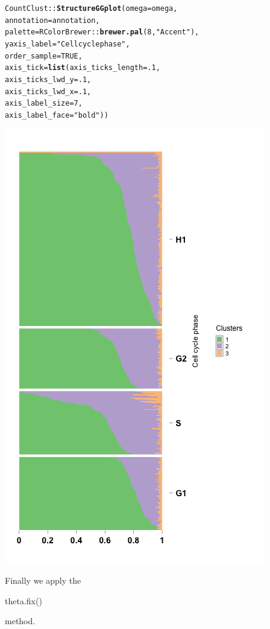 \documentclass[12pt]{article}\usepackage[]{graphicx}\usepackage[usenames,dvipsnames]{color}
\makeatletter
\newcommand{\hlnum}[1]{\textcolor[rgb]{0.686,0.059,0.569}{#1}}%
\newcommand{\hlstr}[1]{\textcolor[rgb]{0.192,0.494,0.8}{#1}}%
\newcommand{\hlopt}[1]{\textcolor[rgb]{0,0,0}{#1}}%
\newcommand{\hlstd}[1]{\textcolor[rgb]{0.345,0.345,0.345}{#1}}%
\newcommand{\hlkwc}[1]{\textcolor[rgb]{0.333,0.667,0.333}{#1}}%
\newcommand{\hlkwd}[1]{\textcolor[rgb]{0.737,0.353,0.396}{\textbf{#1}}}%
\newenvironment{kframe}{%
 \def\at@end@of@kframe{}%
 \ifinner\ifhmode%
  \def\at@end@of@kframe{\end{minipage}}%
  \begin{minipage}{\columnwidth}%
 \fi\fi%
 \def\FrameCommand##1{\hskip\@totalleftmargin \hskip-\fboxsep
 \colorbox{shadecolor}{##1}\hskip-\fboxsep
     \hskip-\linewidth \hskip-\@totalleftmargin \hskip\columnwidth}%
 \MakeFramed {\advance\hsize-\width
   \@totalleftmargin\z@ \linewidth\hsize
   \@setminipage}}%
 {\par\unskip\endMakeFramed%
 \at@end@of@kframe}
\newenvironment{knitrout}{}{} %
\makeatother
\begin{document}
\begin{knitrout}
\begin{kframe}
\begin{alltt}
\hlstd{CountClust}\hlopt{::}\hlkwd{StructureGGplot}\hlstd{(}\hlkwc{omega} \hlstd{= omega,}
                \hlkwc{annotation} \hlstd{= annotation,}
                \hlkwc{palette} \hlstd{= RColorBrewer}\hlopt{::}\hlkwd{brewer.pal}\hlstd{(}\hlnum{8}\hlstd{,} \hlstr{"Accent"}\hlstd{),}
                \hlkwc{yaxis_label} \hlstd{=} \hlstr{"Cell cycle phase"}\hlstd{,}
                \hlkwc{order_sample} \hlstd{=} \hlnum{TRUE}\hlstd{,}
                \hlkwc{axis_tick} \hlstd{=} \hlkwd{list}\hlstd{(}\hlkwc{axis_ticks_length} \hlstd{=} \hlnum{.1}\hlstd{,}
                                 \hlkwc{axis_ticks_lwd_y} \hlstd{=} \hlnum{.1}\hlstd{,}
                                 \hlkwc{axis_ticks_lwd_x} \hlstd{=} \hlnum{.1}\hlstd{,}
                                 \hlkwc{axis_label_size} \hlstd{=} \hlnum{7}\hlstd{,}
                                 \hlkwc{axis_label_face} \hlstd{=} \hlstr{"bold"}\hlstd{))}
\end{alltt}
\end{kframe}
\includegraphics[width=3 in,height=5 in]{figure/structure_leng_2-1} 

\end{knitrout}

Finally we apply the \begin{verb} theta.fix() \end{verb} method.
\end{document}
